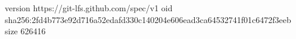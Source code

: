 version https://git-lfs.github.com/spec/v1
oid sha256:2fd4b773e92d716a52edafd330c140204e606ead3ca64532741f01c6472f3eeb
size 626416
